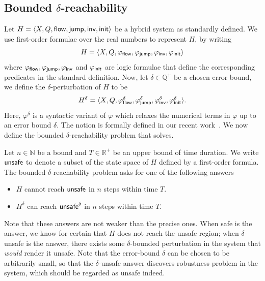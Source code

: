 \subsection{Bounded $\delta$-reachability}\label{sec:delta-reachability}
Let $H = \langle X, Q, \mathsf{flow}, \mathsf{jump}, \mathsf{inv}, \mathsf{init}\rangle$ be a hybrid
system as standardly defined. We use first-order formulae over the
real numbers to represent $H$, by writing $$H = \langle X, Q,
\varphi_{\mathsf{flow}}, \varphi_{\mathsf{jump}}, \varphi_{\mathsf{inv}},
\varphi_{\mathsf{init}}\rangle$$ where $\varphi_{\mathsf{flow}}, \varphi_{\mathsf{jump}},
\varphi_{\mathsf{inv}}$ and $\varphi_{\mathsf{init}}$ are logic formulae that define
the corresponding predicates in the standard definition. Now, let
$\delta\in \mathbb{Q}^+$ be a chosen error bound, we define the
$\delta$-perturbation of $H$ to be $$H^{\delta} = \langle X, Q,
\varphi_{\mathsf{flow}}^{\delta}, \varphi_{\mathsf{jump}}^{\delta},
\varphi_{\mathsf{inv}}^{\delta}, \varphi_{\mathsf{init}}^{\delta}\rangle.$$ Here,
$\varphi^{\delta}$ is a syntactic variant of $\varphi$ which relaxes
the numerical terms in $\varphi$ up to an error bound $\delta$. The
notion is formally defined in our recent
work~\cite{DBLP:conf/lics/GaoAC12,DBLP:conf/cade/GaoAC12,DBLP:journals/corr/GaoKCC14}.
We now define the bounded $\delta$-reachability problem that \dReach{}
solves.

Let $n\in \mathbb{N}$ be a bound and $T\in \mathbb{R}^+$ be an upper
bound of time duration. We write $\mathsf{unsafe}$ to denote a subset of the
state space of $H$ defined by a first-order formula. The bounded
$\delta$-reachability problem asks for one of the following answers
\begin{itemize}
 \item $H$ cannot reach $\mathsf{unsafe}$ in $n$ steps within time $T$.
 \item $H^{\delta}$ can reach $\mathsf{unsafe}^{\delta}$ in $n$ steps within time $T$.
\end{itemize}
Note that these answers are not weaker than the precise ones. When
{\sf safe} is the answer, we know for certain that $H$ does not reach
the unsafe region; when {\sf $\delta$-unsafe} is the answer, there
exists some $\delta$-bounded perturbation in the system that {\em
  would} render it unsafe. Note that the error-bound $\delta$ can be
chosen to be arbitrarily small, so that the {\sf$\delta$-unsafe}
answer discovers robustness problem in the system, which should be
regarded as unsafe indeed.

